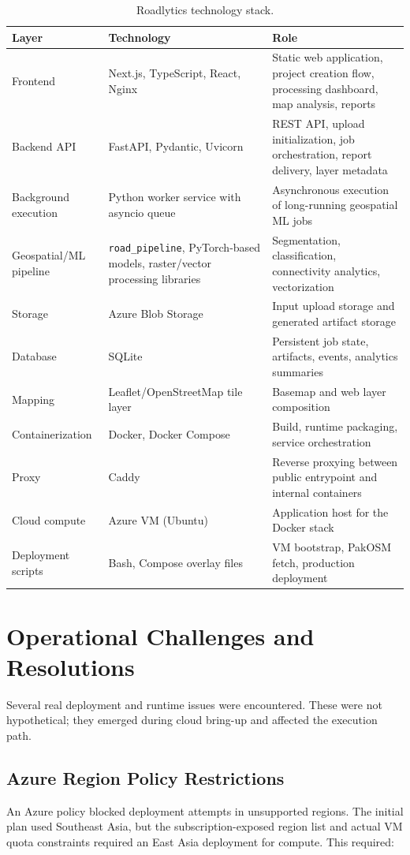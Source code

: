\documentclass[conference]{IEEEtran}
\begin{document}
\begin{table}[t]
\centering
\caption{Roadlytics technology stack.}
\label{tab:stack}
\begin{tabular}{p{32mm} p{42mm} p{88mm}}
\toprule
\textbf{Layer} & \textbf{Technology} & \textbf{Role} \\
\midrule
Frontend & Next.js, TypeScript, React, Nginx & Static web application, project creation flow, processing dashboard, map analysis, reports \\
Backend API & FastAPI, Pydantic, Uvicorn & REST API, upload initialization, job orchestration, report delivery, layer metadata \\
Background execution & Python worker service with asyncio queue & Asynchronous execution of long-running geospatial ML jobs \\
Geospatial/ML pipeline & \texttt{road\_pipeline}, PyTorch-based models, raster/vector processing libraries & Segmentation, classification, connectivity analytics, vectorization \\
Storage & Azure Blob Storage & Input upload storage and generated artifact storage \\
Database & SQLite & Persistent job state, artifacts, events, analytics summaries \\
Mapping & Leaflet/OpenStreetMap tile layer & Basemap and web layer composition \\
Containerization & Docker, Docker Compose & Build, runtime packaging, service orchestration \\
Proxy & Caddy & Reverse proxying between public entrypoint and internal containers \\
Cloud compute & Azure VM (Ubuntu) & Application host for the Docker stack \\
Deployment scripts & Bash, Compose overlay files & VM bootstrap, PakOSM fetch, production deployment \\
\bottomrule
\end{tabular}
\end{table}

\section{Operational Challenges and Resolutions}
Several real deployment and runtime issues were encountered. These were not
hypothetical; they emerged during cloud bring-up and affected the execution
path.

\subsection{Azure Region Policy Restrictions}
An Azure policy blocked deployment attempts in unsupported regions. The initial
plan used Southeast Asia, but the subscription-exposed region list and actual VM
quota constraints required an East Asia deployment for compute. This required:
\end{document}
